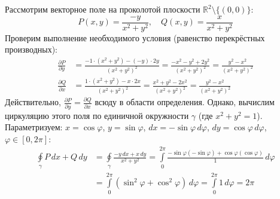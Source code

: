 \documentclass[12pt,a4paper]{article}
\begin{document}
\begin{Example}
Рассмотрим векторное поле на проколотой плоскости $\mathbb{R}^2 \setminus \{(0,0)\}$:
$$ P(x,y) = \frac{-y}{x^2+y^2}, \quad Q(x,y) = \frac{x}{x^2+y^2} $$
Проверим выполнение необходимого условия (равенство перекрёстных производных):
\begin{align*}
    \frac{\partial P}{\partial y} &= \frac{-1 \cdot (x^2+y^2) - (-y) \cdot 2y}{(x^2+y^2)^2} = \frac{-x^2 - y^2 + 2y^2}{(x^2+y^2)^2} = \frac{y^2-x^2}{(x^2+y^2)^2} \\
    \frac{\partial Q}{\partial x} &= \frac{1 \cdot (x^2+y^2) - x \cdot 2x}{(x^2+y^2)^2} = \frac{x^2 + y^2 - 2x^2}{(x^2+y^2)^2} = \frac{y^2-x^2}{(x^2+y^2)^2}
\end{align*}
Действительно, $\frac{\partial P}{\partial y} = \frac{\partial Q}{\partial x}$ всюду в области определения.
Однако, вычислим циркуляцию этого поля по единичной окружности $\gamma$ (где $x^2+y^2=1$). 
Параметризуем: $x = \cos\varphi$, $y = \sin\varphi$, $dx = -\sin\varphi \, d\varphi$, $dy = \cos\varphi \, d\varphi$, $\varphi \in [0, 2\pi]$:
\begin{align*}
    \oint\limits_\gamma P \, dx + Q \, dy &= \oint\limits_\gamma \frac{-y \, dx + x \, dy}{x^2+y^2} = \int\limits_0^{2\pi} \frac{-\sin\varphi(-\sin\varphi) + \cos\varphi(\cos\varphi)}{1} \, d\varphi \\
    &= \int\limits_0^{2\pi} (\sin^2\varphi + \cos^2\varphi) \, d\varphi = \int\limits_0^{2\pi} 1 \, d\varphi = 2\pi
\end{align*}
\begin{center}
\end{center}
\end{Example}
\end{document}
